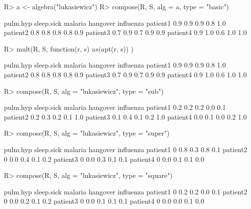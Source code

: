 \documentclass{article}\usepackage[]{graphicx}\usepackage[]{color}
\begin{document}
\begin{Schunk}
% --begin: "comp.basic"
\begin{Sinput}
R> a <- algebra("lukasiewicz")
R> compose(R, S, alg = a, type = "basic")
\end{Sinput}
\begin{Soutput}
         pulm.hyp sleep.sick malaria hangover influenza
patient1      0.9        0.9     0.9      0.8       1.0
patient2      0.8        0.8     0.8      0.8       0.9
patient3      0.7        0.9     0.7      0.9       0.9
patient4      0.9        1.0     0.6      1.0       1.0
\end{Soutput}
%
% --end: "comp.basic"
\end{Schunk}

\begin{Schunk}
% --begin: "comp.mult"
\begin{Sinput}
R> mult(R, S, function(r, s) {
       a$s(a$pt(r, s))
   })
\end{Sinput}
\begin{Soutput}
         pulm.hyp sleep.sick malaria hangover influenza
patient1      0.9        0.9     0.9      0.8       1.0
patient2      0.8        0.8     0.8      0.8       0.9
patient3      0.7        0.9     0.7      0.9       0.9
patient4      0.9        1.0     0.6      1.0       1.0
\end{Soutput}
%
% --end: "comp.mult"
\end{Schunk}

\begin{Schunk}
% --begin: "comp.subsupsquare"
\begin{Sinput}
R> compose(R, S, alg = "lukasiewicz", type = "sub")
\end{Sinput}
\begin{Soutput}
         pulm.hyp sleep.sick malaria hangover influenza
patient1      0.2        0.2     0.2      0.0       0.1
patient2      0.2        0.3     0.2      0.1       1.0
patient3      0.1        0.4     0.1      0.2       1.0
patient4      0.0        0.1     0.0      0.2       1.0
\end{Soutput}
\begin{Sinput}
R> compose(R, S, alg = "lukasiewicz", type = "super")
\end{Sinput}
\begin{Soutput}
         pulm.hyp sleep.sick malaria hangover influenza
patient1        0        0.8     0.3      0.8       0.1
patient2        0        0.0     0.4      0.1       0.2
patient3        0        0.0     0.3      0.1       0.1
patient4        0        0.0     0.1      0.1       0.0
\end{Soutput}
\begin{Sinput}
R> compose(R, S, alg = "lukasiewicz", type = "square")
\end{Sinput}
\begin{Soutput}
         pulm.hyp sleep.sick malaria hangover influenza
patient1        0        0.2     0.2      0.0       0.1
patient2        0        0.0     0.2      0.1       0.2
patient3        0        0.0     0.1      0.1       0.1
patient4        0        0.0     0.0      0.1       0.0
\end{Soutput}
%
% --end: "comp.subsupsquare"
\end{Schunk}
\end{document}
